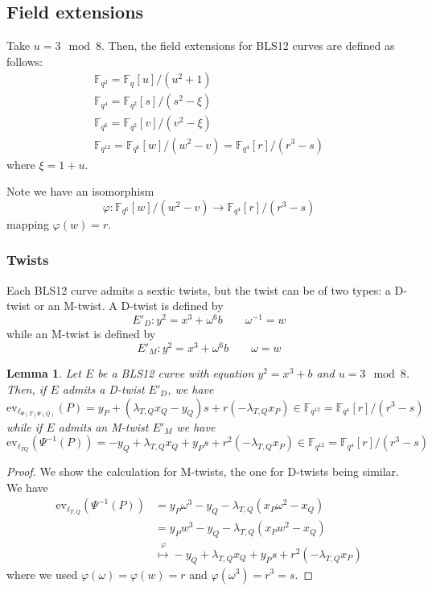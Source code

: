 \documentclass{article}
\newcommand{\ev}{\mathrm{ev}}
\newcommand{\fq}[1]{\mathbb{F}_{q^{#1}}}
\theoremstyle{remark}
\theoremstyle{plain}
\newtheorem{lemma}{Lemma}[section]
\begin{document}
\subsection{Field extensions}

Take $u = 3 \mod 8$.
Then, the field extensions for BLS12 curves are defined as follows:
\[
    \renewcommand{\arraystretch}{1.2}
    \begin{array}{l}
        \fq{2} = \fq{}[u] / (u^2 + 1)\\
        \fq{4} = \fq{2}[s] / (s^2 - \xi)\\
        \fq{6} = \fq{2}[v] / (v^2 - \xi)\\
        \fq{12} = \fq{6}[w] / (w^2 - v) = \fq{4}[r] / (r^3 - s)
    \end{array}
\]
where $\xi = 1 + u$.

Note we have an isomorphism
\[
    \varphi \colon \fq{6}[w] / (w^2 - v) \rightarrow \fq{4}[r] / (r^3 - s)
\]
mapping $\varphi(w) = r$.

\subsubsection{Twists}

Each BLS12 curve admits a sextic twists, but the twist can be of two types: a D-twist or an M-twist.
A D-twist is defined by
\[
    E'_D: y^2 = x^3 + \omega^6 b \quad \quad \omega^{-1} = w
\]
while an M-twist is defined by
\[
    E'_M: y^2 = x^3 + \omega^6 b \quad \quad \omega = w
\]

\begin{lemma}
    \label{lem:lineEvalBLS}
    Let $E$ be a BLS12 curve with equation $y^2 = x^3 + b$ and $u = 3 \mod 8$.
    Then, if $E$ admits a D-twist $E'_D$, we have
    \[
        \ev_{\ell_{\Psi(T)\Psi(Q)}}(P) = y_P + (\lambda_{T,Q} x_Q - y_Q) s + r (- \lambda_{T,Q} x_P) \in \fq{12} = \fq{4}[r] / (r^3 - s)
    \]
    while if $E$ admits an M-twist $E'_M$ we have
    \[
        \ev_{\ell_{TQ}}(\Psi^{-1}(P)) = - y_Q + \lambda_{T,Q} x_Q + y_P s + r^2 (-\lambda_{T,Q} x_P) \in \fq{12} = \fq{4}[r] / (r^3 - s)
    \]
\end{lemma}

\begin{proof}
    We show the calculation for M-twists, the one for D-twists being similar.
    We have
    \[
        \begin{aligned}
            \ev_{\ell_{T,Q}}(\Psi^{-1}(P)) & = y_P \omega^3 - y_Q - \lambda_{T,Q} (x_P \omega^2 - x_Q)\\
            & = y_P w^3 - y_Q - \lambda_{T,Q} (x_P w^2 - x_Q)\\
            & \overset{\varphi}{\mapsto} - y_Q + \lambda_{T,Q} x_Q + y_P s + r^2 (-\lambda_{T,Q} x_P)
        \end{aligned}
    \]
    where we used $\varphi(\omega) = \varphi(w) = r$ and $\varphi(\omega^3) = r^3 =  s$.
\end{proof}
\end{document}
